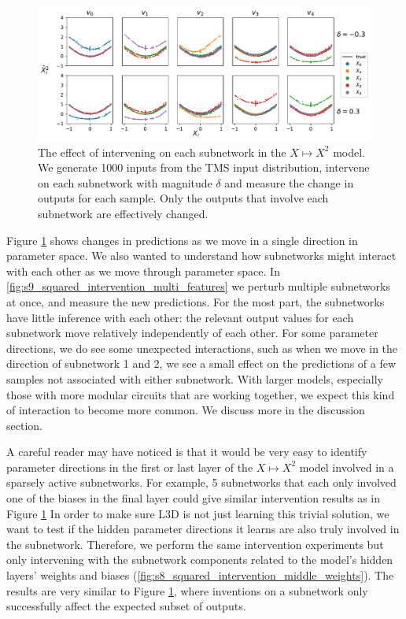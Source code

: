 \documentclass{article}
\theoremstyle{plain}
\theoremstyle{definition}
\theoremstyle{remark}
\begin{document}
\begin{figure}[htbp]
    \centerline{\includegraphics[width=\textwidth]{../figures/9_squared_intervention.pdf}}
    \centering
    \caption{The effect of intervening on each subnetwork in the $X \mapsto X^2$ model. We generate 1000 inputs from the TMS input distribution, intervene on each subnetwork with magnitude $\delta$ and measure the change in outputs for each sample. Only the outputs that involve each subnetwork are effectively changed.}\label{fig:9_squared_intervention}
\end{figure}

Figure \ref{fig:9_squared_intervention} shows changes in predictions as we move in a single direction in parameter space. We also wanted to understand how subnetworks might interact with each other as we move through parameter space. In \ref{fig:s9_squared_intervention_multi_features} we perturb multiple subnetworks at once, and measure the new predictions. For the most part, the subnetworks have little inference with each other: the relevant output values for each subnetwork move relatively independently of each other. For some parameter directions, we do see some unexpected interactions, such as when we move in the direction of subnetwork 1 and 2, we see a small effect on the predictions of a few samples not associated with either subnetwork. With larger models, especially those with more modular circuits that are working together, we expect this kind of interaction to become more common. We discuss more in the discussion section. 

A careful reader may have noticed is that it would be very easy to identify parameter directions in the first or last layer of the $X \mapsto X^2$ model involved in a sparsely active subnetworks. For example, 5 subnetworks that each only involved one of the biases in the final layer could give similar intervention results as in Figure \ref{fig:9_squared_intervention} In order to make sure L3D is not just learning this trivial solution, we want to test if the hidden parameter directions it learns are also truly involved in the subnetwork. Therefore, we perform the same intervention experiments but only intervening with the subnetwork components related to the model's hidden layers' weights and biases (\ref{fig:s8_squared_intervention_middle_weights}). The results are very similar to  Figure \ref{fig:9_squared_intervention}, where inventions on a subnetwork only successfully affect the expected subset of outputs. 
\end{document}
